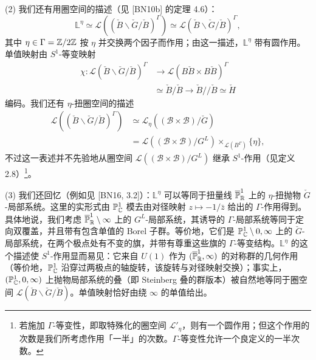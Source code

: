 
(2) 我们还有用圈空间的描述（见 [BN10b] 的定理 4.6）：
\[
\mathbb L^\eta\simeq \mathcal L((\check B\backslash\check G/\check B)^\Gamma)\simeq \mathcal L(\check B\backslash\check G/\check B)^\Gamma,
\]
其中 $\eta\in\Gamma=\mathbb{Z}/2\mathbb{Z}$ 按 $\eta$ 并交换两个因子而作用；由这一描述，$\mathbb L^\eta$ 带有圆作用。单值映射由 $S^1$-等变映射
\[
\begin{aligned}
\chi:\mathcal L(\check B\backslash\check G/\check B)^\Gamma&\longrightarrow \mathcal L(B\check B\times B\check B)^\Gamma\\
&\simeq\check B/\check B\to\check B//\check B\simeq\check H
\end{aligned}
\]
编码。我们还有 $\eta$-扭圈空间的描述
\[
\begin{aligned}
\mathcal L((\check B\backslash\check G/\check B)^\Gamma)
&\simeq \mathcal L_\eta((\mathcal B\times\mathcal B)/\check G)\\
&=\mathcal L((\mathcal B\times\mathcal B)/G^L)\times_{\mathcal L(B^\Gamma)}\{\eta\},
\end{aligned}
\]
不过这一表述并不先验地从圈空间 $\mathcal L((\mathcal B\times\mathcal B)/G^L)$ 继承 $S^1$-作用（见定义 2.8）\footnote{若施加 $\Gamma$-等变性，即取特殊化的圈空间 $\mathcal L'_\eta$，则有一个圆作用；但这个作用的次数是我们所考虑作用「一半」的次数。$\Gamma$-等变性允许一个良定义的一半次数。}。

(3) 我们还回忆（例如见 [BN16, 3.2]）：$\mathbb L^\eta$ 可以等同于扭量线 $\overline{\mathbb{P}}^1_{\mathbb{R}}$ 上的 $\eta$-扭抛物 $\check G$-局部系统。这里的实形式由 $\mathbb{P}^1_{\mathbb{C}}$ 模去由对径映射 $z\mapsto-1/\bar z$ 给出的 $\Gamma$-作用得到。具体地说，我们考虑 $\overline{\mathbb{P}}^1_{\mathbb{R}}\setminus\infty$ 上的 $G^L$-局部系统，其诱导的 $\Gamma$-局部系统等同于定向双覆盖，并且带有包含单值的 Borel 子群。等价地，它们是 $\mathbb{P}^1_{\mathbb{C}}\setminus 0,\infty$ 上的 $\check G$-局部系统，在两个极点处有不变的旗，并带有尊重这些旗的 $\Gamma$-等变结构。$\mathbb L^\eta$ 的这个描述使 $S^1$-作用显而易见：它来自 $U(1)$ 作为 $(\overline{\mathbb{P}}^1_{\mathbb{R}},\infty)$ 的对称群的几何作用（等价地，$\mathbb{P}^1_{\mathbb{C}}$ 沿穿过两极点的轴旋转，该旋转与对径映射交换）；事实上，$(\mathbb{P}^1_{\mathbb{C}},0,\infty)$ 上抛物局部系统的叠（即 Steinberg 叠的群版本）被自然地等同于圈空间 $\mathcal L(\check B\backslash\check G/\check B)$。单值映射恰好由绕 $\infty$ 的单值给出。

